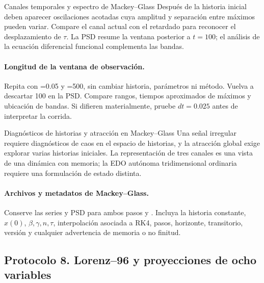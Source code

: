 \begin{cajaverde}{Canales temporales y espectro de Mackey--Glass}
Después de la historia inicial deben aparecer oscilaciones acotadas cuya
amplitud y separación entre máximos pueden variar. Compare el canal actual con
el retardado para reconocer el desplazamiento de \(\tau\). La PSD resume la
ventana posterior a \(t=100\); el análisis de la ecuación diferencial funcional complementa las bandas.
\end{cajaverde}


\paragraph{Longitud de la ventana de observación.}
Repita con =0.05 y =500, sin cambiar historia,
parámetros ni método. Vuelva a descartar 100 en la PSD. Compare rangos, tiempos
aproximados de máximos y ubicación de bandas. Si difieren materialmente, pruebe
\(dt=0.025\) antes de interpretar la corrida.

\begin{cajaalerta}{Diagnósticos de historias y atracción en Mackey--Glass}
Una señal irregular requiere diagnósticos de caos en el espacio de historias, y la atracción global exige explorar varias historias iniciales. La representación de tres canales es
una vista de una dinámica con memoria; la EDO autónoma tridimensional ordinaria
requiere una formulación de estado distinta.
\end{cajaalerta}

\paragraph{Archivos y metadatos de Mackey--Glass.}
Conserve las series y PSD para ambos pasos y
. Incluya la historia constante, \(x(0)\),
\(\beta,\gamma,n,\tau\), interpolación asociada a RK4, pasos, horizonte,
transitorio, versión y cualquier advertencia de memoria o no finitud.

\subsection{Protocolo 8. Lorenz--96 y proyecciones de ocho variables}

